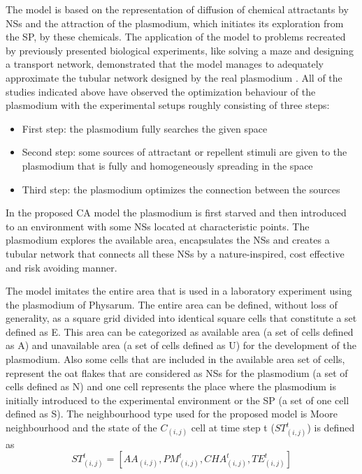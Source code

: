 The model is based on the representation of diffusion of chemical attractants by NSs and the attraction of the plasmodium, which initiates its exploration from the SP, by these chemicals. The application of the model to problems recreated by previously presented biological experiments, like solving a maze and designing a transport network, demonstrated that the model manages to adequately approximate the tubular network designed by the real plasmodium \cite{shirakawa2015construction}.
All of the studies indicated above have observed the optimization behaviour of the plasmodium with the experimental setups roughly
consisting of three steps:
\begin{itemize}
\item First step: the plasmodium fully searches the given space
\item Second step: some sources of attractant or repellent stimuli are given to the plasmodium that is fully and homogeneously spreading in the space
\item Third step: the plasmodium optimizes the connection between the sources
\end{itemize}

In the proposed CA model the plasmodium is first starved and then introduced to an environment with some NSs located at characteristic points. The plasmodium explores the available area, encapsulates the NSs and creates a tubular network that connects all these NSs by a nature-inspired, cost effective and risk avoiding manner.
\par
The model imitates the entire area that is used in a laboratory experiment using the plasmodium of Physarum. The entire area can be defined, without loss of generality, as a square grid divided into identical square cells that constitute a set defined as E. This area can be categorized as available area (a set of cells defined as A) and unavailable area (a set of cells defined as U) for the development of the plasmodium.
Also some cells that are included in the available area set of cells, represent the oat flakes that are considered as NSs for the plasmodium (a set of cells defined as N) and one cell represents the place where the plasmodium is initially introduced to the
experimental environment or the SP (a set of one cell defined as S). 
The neighbourhood type used for the proposed model is Moore neighbourhood and the state of the $C_{(i, j)}$ cell at time step t ($ ST^t_{(i, j)}$) is defined as \[ST^t_{(i, j)} = [AA_{(i, j)}, PM^t_{(i, j)}, CHA^t_{(i, j)}, TE^t_{(i, j)}]\]